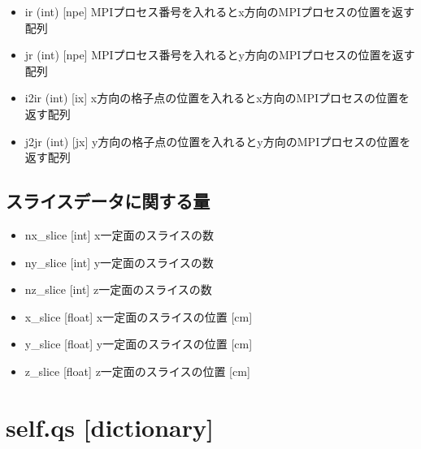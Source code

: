 \documentclass[letterpaper,10pt,dvipdfmx,report]{sphinxmanual}
\begin{document}
\begin{itemize}
\item {} 
ir (int) {[}npe{]} \sphinxhyphen{}\sphinxhyphen{} MPIプロセス番号を入れるとx方向のMPIプロセスの位置を返す配列

\item {} 
jr (int) {[}npe{]} \sphinxhyphen{}\sphinxhyphen{} MPIプロセス番号を入れるとy方向のMPIプロセスの位置を返す配列

\item {} 
i2ir (int) {[}ix{]} \sphinxhyphen{}\sphinxhyphen{} x方向の格子点の位置を入れるとx方向のMPIプロセスの位置を返す配列

\item {} 
j2jr (int) {[}jx{]} \sphinxhyphen{}\sphinxhyphen{} y方向の格子点の位置を入れるとy方向のMPIプロセスの位置を返す配列

\end{itemize}


\subsection{スライスデータに関する量}
\label{\detokenize{notation:id4}}\begin{itemize}
\item {} 
nx\_slice {[}int{]} \sphinxhyphen{}\sphinxhyphen{} x一定面のスライスの数

\item {} 
ny\_slice {[}int{]} \sphinxhyphen{}\sphinxhyphen{} y一定面のスライスの数

\item {} 
nz\_slice {[}int{]} \sphinxhyphen{}\sphinxhyphen{} z一定面のスライスの数

\item {} 
x\_slice {[}float{]} \sphinxhyphen{}\sphinxhyphen{} x一定面のスライスの位置 {[}cm{]}

\item {} 
y\_slice {[}float{]} \sphinxhyphen{}\sphinxhyphen{} y一定面のスライスの位置 {[}cm{]}

\item {} 
z\_slice {[}float{]} \sphinxhyphen{}\sphinxhyphen{} z一定面のスライスの位置 {[}cm{]}

\end{itemize}


\section{self.qs {[}dictionary{]}}
\label{\detokenize{notation:self-qs-dictionary}}
\begin{sphinxVerbatim}[commandchars=\\\{\}]
  
  
\end{sphinxVerbatim}
\end{document}
